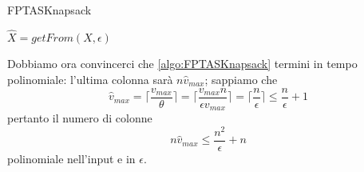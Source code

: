 \begin{algorithm}
	\caption{FPTASKnapsack}
	\label{algo:FPTASKnapsack}

	$
		\hat{X} = getFrom(X, \epsilon)
	$


\end{algorithm}

Dobbiamo ora convincerci che \cref{algo:FPTASKnapsack} termini
in tempo polinomiale: l'ultima colonna sarà $n \hat{v}_{max}$;
sappiamo che
$$
	\hat{v}_{max} = \lceil \frac{v_{max}}{\theta} \rceil = \lceil \frac{v_{max} n}{\epsilon v_{max}} \rceil
	=\lceil \frac{n}{\epsilon}\rceil \leq \frac{n}{\epsilon} + 1
$$
pertanto il numero di colonne
$$
	n\hat{v}_{max} \leq \frac{n^2}{\epsilon} + n
$$
polinomiale nell'input e in $\epsilon$.
